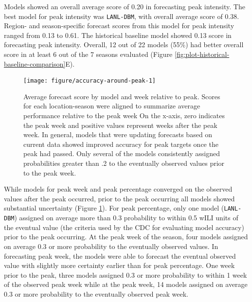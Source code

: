 \documentclass[9pt,twocolumn,twoside]{pnas-new}\usepackage[]{graphicx}\usepackage[]{color}
\newenvironment{knitrout}{}{} %
\begin{document}
Models showed an overall average score of 
0.20
in forecasting peak intensity. 
The best model for peak intensity was 
{\tt LANL-DBM}, 
with overall average score of 
0.38. 
Region- and season-specific forecast scores from this model for peak intensity ranged from
0.13 to 
0.61.
The historical baseline model showed 
0.13 
score in forecasting peak intensity.
Overall, 12 out of 22 models (55\%) had better overall score in at least 6 out of the 7 seasons evaluated (Figure \ref{fig:plot-historical-baseline-comparison}E).


\begin{knitrout}
\color{fgcolor}\begin{figure}
\texttt{[image: figure/accuracy-around-peak-1]} \caption[Average forecast score by model and week relative to peak]{Average forecast score by model and week relative to peak. Scores for each location-season were aligned to summarize average performance relative to the peak week On the x-axis, zero indicates the peak week and positive values represent weeks after the peak week. In general, models that were updating forecasts based on current data showed improved accuracy for peak targets once the peak had passed. Only several of the models consistently assigned probabilities greater than .2 to the eventually observed values prior to the peak week.}\label{fig:accuracy-around-peak}
\end{figure}


\end{knitrout}

While models for peak week and peak percentage converged on the observed values after the peak occurred, prior to the peak occurring all models showed substantial uncertainty (Figure \ref{fig:accuracy-around-peak}). 
For peak percentage, only one model ({\tt LANL-DBM}) assigned on average more than 0.3 probability to within 0.5 wILI units of the eventual value (the criteria used by the CDC for evaluating model accuracy) prior to the peak occurring. At the peak week of the season, four models assigned on average 0.3 or more probability to the eventually observed values. In forecasting peak week, the models were able to forecast the eventual observed value with slightly more certainty earlier than for peak percentage. One week prior to the peak, three models assigned 0.3 or more probability to within 1 week of the observed peak week while at the peak week, 14 models assigned on average 0.3 or more probability to the eventually observed peak week.
\end{document}
